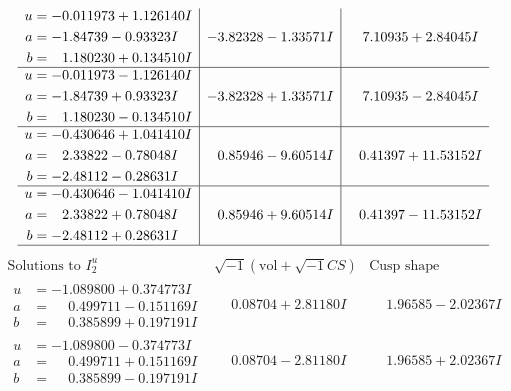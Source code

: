 \documentclass[1p]{elsarticle_modified}
\theoremstyle{definition}
\newcommand{\I}{\sqrt{-1}}
\begin{document}
$$\begin{array}{c|c|c}
\begin{aligned}
u &= -0.011973 + 1.126140 I \\
a &= -1.84739 - 0.93323 I \\
b &= \phantom{-}1.180230 + 0.134510 I\end{aligned}
 & -3.82328 - 1.33571 I & \phantom{-}7.10935 + 2.84045 I \\ \hline\begin{aligned}
u &= -0.011973 - 1.126140 I \\
a &= -1.84739 + 0.93323 I \\
b &= \phantom{-}1.180230 - 0.134510 I\end{aligned}
 & -3.82328 + 1.33571 I & \phantom{-}7.10935 - 2.84045 I \\ \hline\begin{aligned}
u &= -0.430646 + 1.041410 I \\
a &= \phantom{-}2.33822 - 0.78048 I \\
b &= -2.48112 - 0.28631 I\end{aligned}
 & \phantom{-}0.85946 - 9.60514 I & \phantom{-}0.41397 + 11.53152 I \\ \hline\begin{aligned}
u &= -0.430646 - 1.041410 I \\
a &= \phantom{-}2.33822 + 0.78048 I \\
b &= -2.48112 + 0.28631 I\end{aligned}
 & \phantom{-}0.85946 + 9.60514 I & \phantom{-}0.41397 - 11.53152 I\\
 \hline 
 \end{array}$$\newpage$$\begin{array}{c|c|c}  
\text{Solutions to }I^u_{2}& \I (\text{vol} + \sqrt{-1}CS) & \text{Cusp shape}\\
 \hline 
\begin{aligned}
u &= -1.089800 + 0.374773 I \\
a &= \phantom{-}0.499711 - 0.151169 I \\
b &= \phantom{-}0.385899 + 0.197191 I\end{aligned}
 & \phantom{-}0.08704 + 2.81180 I & \phantom{-}1.96585 - 2.02367 I \\ \hline\begin{aligned}
u &= -1.089800 - 0.374773 I \\
a &= \phantom{-}0.499711 + 0.151169 I \\
b &= \phantom{-}0.385899 - 0.197191 I\end{aligned}
 & \phantom{-}0.08704 - 2.81180 I & \phantom{-}1.96585 + 2.02367 I \\ \hline\begin{aligned}

\end{aligned}
\end{array}$$
\end{document}
